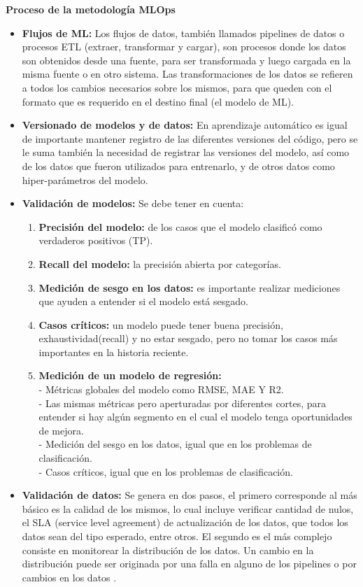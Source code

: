 \textbf{Proceso de la metodología MLOps}
\begin{itemize}
\item \textbf{Flujos de ML:} Los flujos de datos, también llamados pipelines de datos o procesos ETL (extraer, transformar y cargar), son procesos donde los datos son obtenidos desde una fuente, para ser transformada y luego cargada en la misma fuente o en otro sistema. Las transformaciones de los datos se refieren a todos los cambios necesarios sobre los mismos, para que queden con el formato que es requerido en el destino final (el modelo de ML).
\item \textbf{Versionado de modelos y de datos:} En aprendizaje automático es igual de importante mantener registro de las diferentes versiones del código, pero se le suma también la necesidad de registrar las versiones del modelo, así como de los datos que fueron utilizados para entrenarlo, y de otros datos como hiper-parámetros del modelo.
\item \textbf{Validación de modelos:} Se debe tener en cuenta:
    \begin{enumerate}
        \item \textbf{Precisión del modelo:} de los casos que el modelo clasificó como verdaderos positivos (TP).
        \item \textbf{Recall del modelo:} la precisión abierta por categorías.
        \item \textbf{Medición de sesgo en los datos:} es importante realizar mediciones que ayuden a entender si el modelo está sesgado.
        \item \textbf{Casos críticos:} un modelo puede tener buena precisión, exhaustividad(recall) y no estar sesgado, pero no tomar los casos más importantes en la historia reciente.
        \item \textbf{Medición de un modelo de regresión:}\\
- Métricas globales del modelo como RMSE, MAE Y R2.\\
- Las mismas métricas pero aperturadas por diferentes cortes, para entender si hay algún segmento en el cual el modelo tenga oportunidades de mejora.\\
- Medición del sesgo en los datos, igual que en los problemas de clasificación.\\
- Casos críticos, igual que en los problemas de clasificación.
    \end{enumerate}
\item \textbf{Validación de datos:} Se genera en dos pasos, el primero corresponde al más básico es la calidad de los mismos, lo cual incluye verificar cantidad de nulos, el SLA (service level agreement) de actualización de los datos, que todos los datos sean del tipo esperado, entre otros. El segundo es el más complejo consiste en monitorear la distribución de los datos. Un cambio en la distribución puede ser originada por una falla en alguno de los pipelines o por cambios en los datos \citep{rivero2022}. 
\end{itemize}


